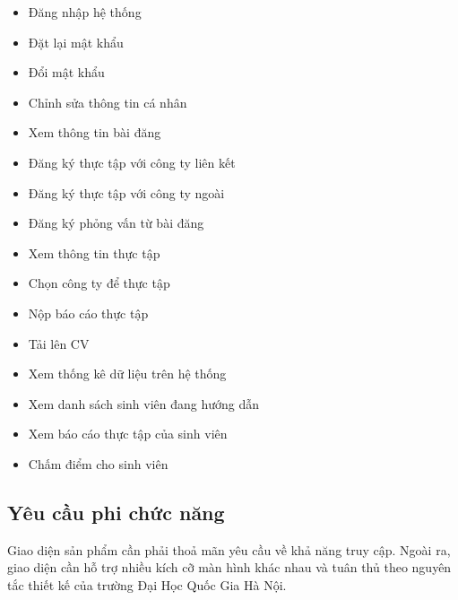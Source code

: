 \documentclass[./../main.tex]{subfiles}
\begin{document}
\begin{itemize}
	\item

	      Đăng nhập hệ thống

	\item

	      Đặt lại mật khẩu

	\item

	      Đổi mật khẩu

	\item

	      Chỉnh sửa thông tin cá nhân

	\item

	      Xem thông tin bài đăng

	\item

	      Đăng ký thực tập với công ty liên kết

	\item

	      Đăng ký thực tập với công ty ngoài

	\item

	      Đăng ký phỏng vấn từ bài đăng

	\item

	      Xem thông tin thực tập

	\item

	      Chọn công ty để thực tập

	\item

	      Nộp báo cáo thực tập

	\item

	      Tải lên CV

	\item

	      Xem thống kê dữ liệu trên hệ thống

	\item

	      Xem danh sách sinh viên đang hướng dẫn

	\item

	      Xem báo cáo thực tập của sinh viên

	\item

	      Chấm điểm cho sinh viên

\end{itemize}

\subsection{Yêu cầu phi chức năng}

Giao diện sản phẩm cần phải thoả mãn yêu cầu về khả năng truy cập. Ngoài
ra, giao diện cần hỗ trợ nhiều kích cỡ màn hình khác nhau và tuân thủ
theo nguyên tắc thiết kế của trường Đại Học Quốc Gia Hà Nội.
\end{document}
